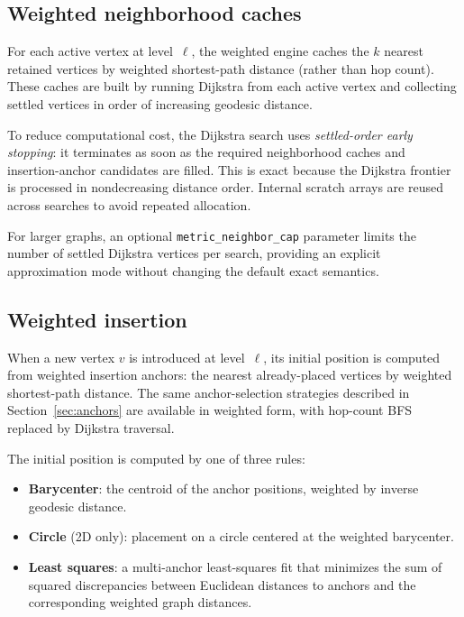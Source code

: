\documentclass[11pt,twocolumn]{article}
\begin{document}
\subsection{Weighted neighborhood caches}\label{sec:wcaches}

For each active vertex at level~$\ell$, the weighted engine caches the
$k$ nearest retained vertices by weighted shortest-path distance (rather
than hop count).  These caches are built by running Dijkstra from each
active vertex and collecting settled vertices in order of increasing
geodesic distance.

To reduce computational cost, the Dijkstra search uses
\emph{settled-order early stopping}: it terminates as soon as the
required neighborhood caches and insertion-anchor candidates are filled.
This is exact because the Dijkstra frontier is processed in
nondecreasing distance order.  Internal scratch arrays are reused across
searches to avoid repeated allocation.

For larger graphs, an optional \texttt{metric\_neighbor\_cap} parameter
limits the number of settled Dijkstra vertices per search, providing an
explicit approximation mode without changing the default exact semantics.

\subsection{Weighted insertion}\label{sec:winsertion}

When a new vertex $v$ is introduced at level~$\ell$, its initial position
is computed from weighted insertion anchors: the nearest already-placed
vertices by weighted shortest-path distance.  The same anchor-selection
strategies described in Section~\ref{sec:anchors} are available in
weighted form, with hop-count BFS replaced by Dijkstra traversal.

The initial position is computed by one of three rules:
\begin{itemize}
\item \textbf{Barycenter}: the centroid of the anchor positions, weighted
  by inverse geodesic distance.
\item \textbf{Circle} (2D only): placement on a circle centered at the
  weighted barycenter.
\item \textbf{Least squares}: a multi-anchor least-squares fit that
  minimizes the sum of squared discrepancies between Euclidean distances
  to anchors and the corresponding weighted graph distances.
\end{itemize}
\end{document}
